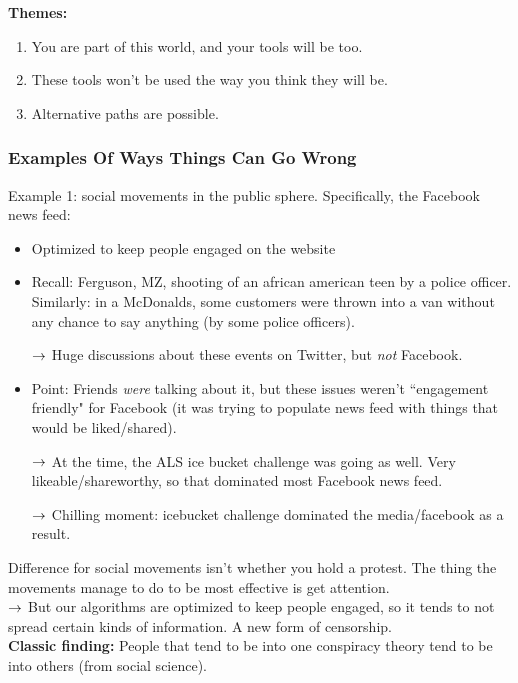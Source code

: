 {\bf Themes:}
\begin{enumerate}
    \item You are part of this world, and your tools will be too.
    \item These tools won't be used the way you think they will be.
    \item Alternative paths are possible.
\end{enumerate}

\subsubsection{Examples Of Ways Things Can Go Wrong}

Example 1: social movements in the public sphere. Specifically, the Facebook news feed:
\begin{itemize}
    \item Optimized to keep people engaged on the website
    \item Recall: Ferguson, MZ, shooting of an african american teen by a police officer. Similarly: in a McDonalds, some customers were thrown into a van without any chance to say anything (by some police officers).
    
    $\rightarrow$ Huge discussions about these events on Twitter, but {\it not} Facebook. 
    
    \item Point: Friends {\it were} talking about it, but these issues weren't ``engagement friendly" for Facebook (it was trying to populate news feed with things that would be liked/shared).
    
    $\rightarrow$ At the time, the ALS ice bucket challenge was going as well. Very likeable/shareworthy, so that dominated most Facebook news feed.
    
    $\rightarrow$ Chilling moment: icebucket challenge dominated the media/facebook as a result.
\end{itemize}

Difference for social movements isn't whether you hold a protest. The thing the movements manage to do to be most effective is get attention. \\

$\rightarrow$ But our algorithms are optimized to keep people engaged, so it tends to not spread certain kinds of information. A new form of censorship. \\

{\bf Classic finding:} People that tend to be into one conspiracy theory tend to be into others (from social science). \\

